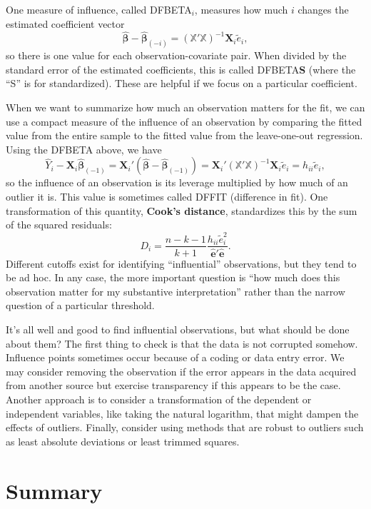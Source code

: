 \documentclass[
  13pt,
  letterpaper,
  DIV=11,
  numbers=noendperiod]{scrreprt}
\newcommand{\mb}{\symbf}
\newcommand{\X}{\mb{X}}
\newcommand{\Xmat}{\mathbb{X}}
\newcommand{\bhat}{\widehat{\mb{\beta}}}
\theoremstyle{plain}
\theoremstyle{definition}
\theoremstyle{definition}
\theoremstyle{remark}
\begin{document}
One measure of influence, called DFBETA\(_i\), measures how much \(i\)
changes the estimated coefficient vector \[ 
\bhat - \bhat_{(-i)} = \left( \Xmat'\Xmat\right)^{-1}\X_i\widetilde{e}_i,
\] so there is one value for each observation-covariate pair. When
divided by the standard error of the estimated coefficients, this is
called DFBETA\textbf{S} (where the ``S'' is for standardized). These are
helpful if we focus on a particular coefficient.

When we want to summarize how much an observation matters for the fit,
we can use a compact measure of the influence of an observation by
comparing the fitted value from the entire sample to the fitted value
from the leave-one-out regression. Using the DFBETA above, we have \[ 
\widehat{Y}_i - \X_{i}\bhat_{(-1)} = \X_{i}'(\bhat -\bhat_{(-1)}) = \X_{i}'\left( \Xmat'\Xmat\right)^{-1}\X_i\widetilde{e}_i = h_{ii}\widetilde{e}_i,
\] so the influence of an observation is its leverage multiplied by how
much of an outlier it is. This value is sometimes called DFFIT
(difference in fit). One transformation of this quantity, \textbf{Cook's
distance}, standardizes this by the sum of the squared residuals: \[ 
D_i = \frac{n-k-1}{k+1}\frac{h_{ii}\widetilde{e}_{i}^{2}}{\widehat{\mb{e}}'\widehat{\mb{e}}}.
\] Different cutoffs exist for identifying ``influential'' observations,
but they tend to be ad hoc. In any case, the more important question is
``how much does this observation matter for my substantive
interpretation'' rather than the narrow question of a particular
threshold.

It's all well and good to find influential observations, but what should
be done about them? The first thing to check is that the data is not
corrupted somehow. Influence points sometimes occur because of a coding
or data entry error. We may consider removing the observation if the
error appears in the data acquired from another source but exercise
transparency if this appears to be the case. Another approach is to
consider a transformation of the dependent or independent variables,
like taking the natural logarithm, that might dampen the effects of
outliers. Finally, consider using methods that are robust to outliers
such as least absolute deviations or least trimmed squares.

\section{Summary}\label{summary-5}
\end{document}
